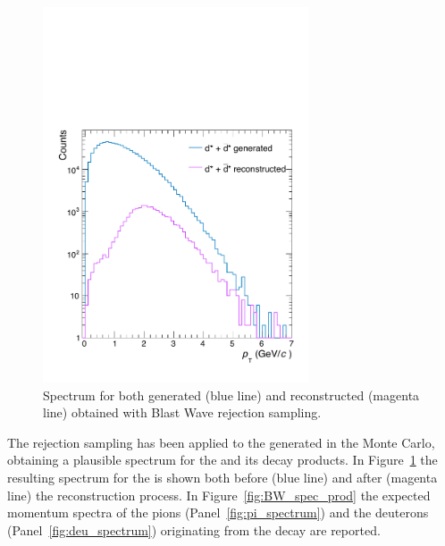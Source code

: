\begin{figure} [htb]
    \centering
    \includegraphics[width=0.7\textwidth]{gfx/genrecBW}
	\caption{Spectrum for both generated (blue line) and reconstructed (magenta line) \ds obtained with Blast Wave rejection sampling.}
	\label{fig:bw_spectrum}
\end{figure}

The rejection sampling has been applied to the \ds generated in the Monte Carlo, obtaining a 
plausible \pt spectrum for the \ds and its decay products. In Figure~\ref{fig:bw_spectrum} the
resulting \pt spectrum for the \ds is shown both before (blue line) and after (magenta line) the
reconstruction process. 
In Figure~\ref{fig:BW_spec_prod} the expected momentum spectra of the pions 
(Panel~\ref{fig:pi_spectrum}) and the deuterons (Panel~\ref{fig:deu_spectrum}) originating from
the \ds decay are reported.

